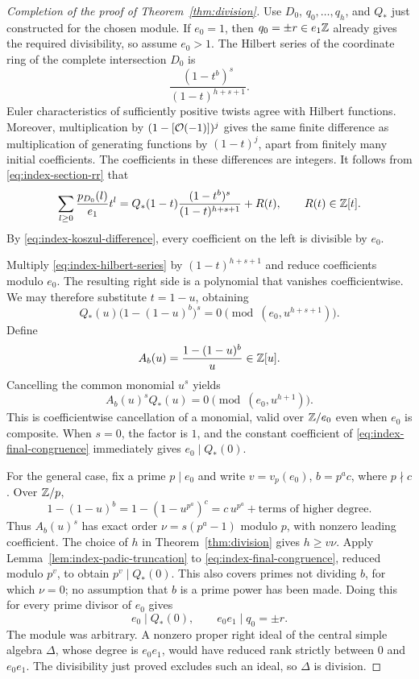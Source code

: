 \begin{proof}[Completion of the proof of Theorem~\ref{thm:division}]
Use \(D_0\), \(q_0,\ldots,q_h\), and \(Q_*\) just constructed for
the chosen module.
If \(e_0=1\), then \(q_0=\pm r\in e_1\mathbb Z\) already gives the required
divisibility, so assume \(e_0>1\).
The Hilbert series of the coordinate ring of the complete
intersection \(D_0\) is
\[
 \frac{(1-t^b)^s}{(1-t)^{h+s+1}}.
\]
Euler characteristics of sufficiently positive twists agree
with Hilbert functions.  Moreover, multiplication by
\((1-[\mathcal O(-1)])^j\) gives the same finite difference as
multiplication of generating functions by \((1-t)^j\), apart
from finitely many initial coefficients.  The coefficients in
these differences are integers.  It follows from
\eqref{eq:index-section-rr} that
\begin{equation}\label{eq:index-hilbert-series}
 \sum_{l\ge0}\frac{p_{D_0}(l)}{e_1}t^l
   =Q_*(1-t)\frac{(1-t^b)^s}{(1-t)^{h+s+1}}+R(t),
 \qquad R(t)\in\mathbb Z[t].
\end{equation}
By \eqref{eq:index-koszul-difference}, every coefficient on the
left is divisible by \(e_0\).

Multiply \eqref{eq:index-hilbert-series} by
\((1-t)^{h+s+1}\) and reduce coefficients modulo \(e_0\).
The resulting right side is a polynomial that vanishes
coefficientwise.  We may therefore substitute \(t=1-u\), obtaining
\[
 Q_*(u)\bigl(1-(1-u)^b\bigr)^s
     =0\pmod{(e_0,u^{h+s+1})}.
\]
Define
\[
 A_b(u)=\frac{1-(1-u)^b}{u}\in\mathbb Z[u].
\]
Cancelling the common monomial \(u^s\) yields
\begin{equation}\label{eq:index-final-congruence}
 A_b(u)^sQ_*(u)=0\pmod{(e_0,u^{h+1})}.
\end{equation}
This is coefficientwise cancellation of a monomial, valid over
\(\mathbb Z/e_0\) even when \(e_0\) is composite.  When \(s=0\), the
factor is \(1\), and the constant coefficient of
\eqref{eq:index-final-congruence} immediately gives
\(e_0\mid Q_*(0)\).

For the general case, fix a prime \(p\mid e_0\) and write
\(v=v_p(e_0)\), \(b=p^a c\), where \(p\nmid c\).
Over \(\mathbb Z/p\),
\[
 1-(1-u)^b
   =1-(1-u^{p^a})^c
   =c\,u^{p^a}+\text{terms of higher degree}.
\]
Thus \(A_b(u)^s\) has exact order
\(\nu=s(p^a-1)\) modulo \(p\), with nonzero leading coefficient.
The choice of \(h\) in Theorem~\ref{thm:division} gives
\(h\ge v\nu\).
Apply Lemma~\ref{lem:index-padic-truncation} to
\eqref{eq:index-final-congruence}, reduced modulo \(p^v\), to obtain
\(p^v\mid Q_*(0)\).
This also covers primes not dividing \(b\), for which \(\nu=0\);
no assumption that \(b\) is a prime power has been made.
Doing this for every prime divisor of \(e_0\) gives
\[
 e_0\mid Q_*(0),\qquad
 e_0e_1\mid q_0=\pm r.
\]
The module was arbitrary.  A nonzero proper right ideal of the
central simple algebra \(\Delta\), whose degree is \(e_0e_1\),
would have reduced rank strictly between \(0\) and \(e_0e_1\).
The divisibility just proved excludes such an ideal, so
\(\Delta\) is division.
\end{proof}
